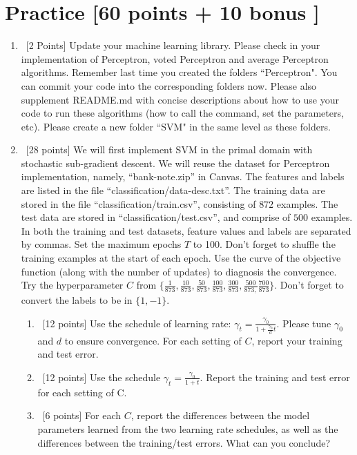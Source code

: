 \documentclass[12pt, fullpage,letterpaper]{article}
\begin{document}
\section{Practice [60 points + 10 bonus ]}
\begin{enumerate}
	\item~[2 Points] Update your machine learning library. Please check in your implementation of Perceptron, voted Perceptron and average Perceptron algorithms. Remember last time you created the folders ``Perceptron". You can commit your code into the corresponding folders now. Please also supplement README.md with concise descriptions about how to use your code to run these algorithms (how to call the command, set the parameters, etc). Please create a new folder ``SVM" in the same level as these folders.  

	\item~[28 points] We will first implement SVM in the primal domain with stochastic sub-gradient descent. We will reuse the  dataset for Perceptron implementation, namely, ``bank-note.zip'' in Canvas. The features and labels are listed in the file ``classification/data-desc.txt''. The training data are stored in the file ``classification/train.csv'', consisting of $872$ examples. The test data are stored in ``classification/test.csv'', and comprise of $500$ examples. In both the training and test datasets, feature values and labels are separated by commas. Set the maximum epochs $T$ to 100. Don't forget to shuffle the training examples at the start of each epoch. Use the curve of the objective function (along with the number of updates) to diagnosis the convergence. Try the hyperparameter $C$ from $\{\frac{1}{873}, \frac{10}{873}, \frac{50}{873}, \frac{100}{873}, \frac{300}{873}, \frac{500}{873,} \frac{700}{873}\}$. Don't forget to convert the labels to be in $\{1, -1\}$.  
	\begin{enumerate}
		\item~[12 points] Use the schedule of learning rate: $\gamma_t = \frac{\gamma_0}{1+\frac{\gamma_0}{d}t}	$. Please tune $\gamma_0$ and $d$ to ensure convergence. For each setting of $C$, report your training and test error. 
		\item~[12 points] Use the schedule $\gamma_t = \frac{\gamma_0}{1+t}$. Report the training and test error for each setting of C. 
		\item~[6 points] For each $C$, report the differences between the model parameters learned from the two learning rate schedules, as well as the differences between the training/test errors. What can you conclude? 
	\end{enumerate}



\end{enumerate}
\end{document}

